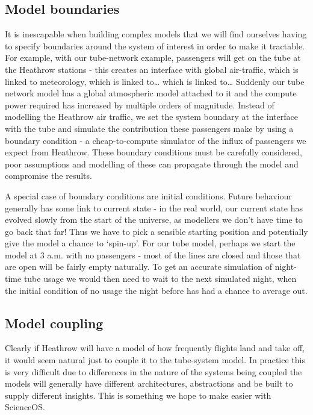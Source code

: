 \subsection{Model boundaries} 

It is inescapable when building complex models that we will
find ourselves having to specify boundaries around the system of interest in
order to make it tractable. For example, with our tube-network example,
passengers will get on the tube at the Heathrow stations - this creates an
interface with global air-traffic, which is linked to meteorology, which is
linked to… which is linked to… Suddenly our tube network model has a global
atmospheric model attached to it and the compute power required has increased
by multiple orders of magnitude. Instead of modelling the Heathrow air traffic,
we set the system boundary at the interface with the tube and simulate the
contribution these passengers make by using a boundary condition - a
cheap-to-compute simulator of the influx of passengers we expect from Heathrow.
These boundary conditions must be carefully considered, poor assumptions and
modelling of these can propagate through the model and compromise the results.

A special case of boundary conditions are initial conditions. Future behaviour
generally has some link to current state - in the real world, our current state
has evolved slowly from the start of the universe, as modellers we don’t have
time to go back that far! Thus we have to pick a sensible starting position and
potentially give the model a chance to ‘spin-up’. For our tube model, perhaps
we start the model at 3 a.m. with no passengers - most of the lines are closed
and those that are open will be fairly empty naturally. To get an accurate
simulation of night-time tube usage we would then need to wait to the next
simulated night, when the initial condition of no usage the night before has
had a chance to average out.

\subsection{Model coupling} 

Clearly if Heathrow will have a model of how frequently flights
land and take off, it would seem natural just to couple it to the tube-system
model. In practice this is very difficult due to differences in the nature of
the systems being coupled the models will generally have different
architectures, abstractions and be built to supply different insights. This is
something we hope to make easier with ScienceOS.

